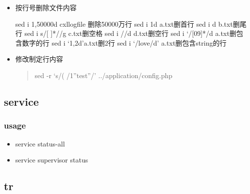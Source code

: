 \documentclass[a4paper,10pt,english]{sphinxmanual}
\begin{document}
\begin{itemize}
\item {} 
按行号删除文件内容

\begin{sphinxVerbatim}[commandchars=\\\{\}]
sed \PYGZhy{}i \PYGZsq{}1,50000d\PYGZsq{} \PYGZdq{}\PYGZdl{}cxl\PYGZus{}log\PYGZus{}file\PYGZdq{} \PYGZsh{} 删除50000万行
sed \PYGZhy{}i \PYGZsq{}1d\PYGZsq{} a.txt删首行
sed \PYGZhy{}i \PYGZsq{}\PYGZdl{}d\PYGZsq{} b.txt删尾行
sed \PYGZhy{}i \PYGZsq{}s/[ ]*//g\PYGZsq{} c.txt删空格
sed \PYGZhy{}i \PYGZsq{}/\PYGZca{}\PYGZdl{}/d\PYGZsq{} d.txt删空行
sed \PYGZhy{}i ‘/\PYGZca{}[0\PYGZhy{}9]*\PYGZdl{}/d\PYGZsq{} a.txt删包含数字的行
sed \PYGZhy{}i ‘1,2d’a.txt删2行
sed \PYGZhy{}i ‘/love/d’ a.txt删包含string的行
\end{sphinxVerbatim}

\item {} 
修改制定行内容
\begin{quote}

sed -r  ‘s/( /1”test”/’  ../application/config.php
\end{quote}

\end{itemize}


\subsection{service}
\label{\detokenize{linux/shell:service}}

\subsubsection{usage}
\label{\detokenize{linux/shell:id9}}\begin{itemize}
\item {} 
service \textendash{}status-all

\item {} 
service supervisor status

\end{itemize}


\subsection{tr}
\label{\detokenize{linux/shell:tr}}
\end{document}
